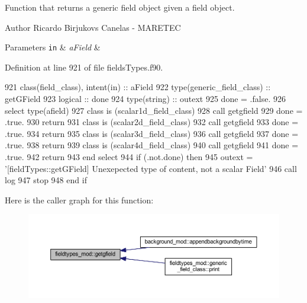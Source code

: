 Function that returns a generic field object given a field object. 

\begin{DoxyAuthor}{Author}
Ricardo Birjukovs Canelas -\/ M\+A\+R\+E\+T\+EC 
\end{DoxyAuthor}

\begin{DoxyParams}[1]{Parameters}
\mbox{\tt in}  & {\em a\+Field} & \\
\hline
\end{DoxyParams}


Definition at line 921 of file fields\+Types.\+f90.


\begin{DoxyCode}
921     \textcolor{keywordtype}{class}(field\_class), \textcolor{keywordtype}{intent(in)} :: aField
922     \textcolor{keywordtype}{type}(generic\_field\_class) :: getGField
923     \textcolor{keywordtype}{logical} :: done
924     \textcolor{keywordtype}{type}(string) :: outext
925     done = .false.
926     \textcolor{keywordflow}{select type}(afield)
927 \textcolor{keywordflow}{    class is} (scalar1d\_field\_class)
928         \textcolor{keyword}{call }getgfield%
929         done = .true.
930         \textcolor{keywordflow}{return}
931 \textcolor{keywordflow}{    class is} (scalar2d\_field\_class)
932         \textcolor{keyword}{call }getgfield%
933         done = .true.
934         \textcolor{keywordflow}{return}
935 \textcolor{keywordflow}{    class is} (scalar3d\_field\_class)
936         \textcolor{keyword}{call }getgfield%
937         done = .true.
938         \textcolor{keywordflow}{return}
939 \textcolor{keywordflow}{    class is} (scalar4d\_field\_class)
940         \textcolor{keyword}{call }getgfield%
941         done = .true.
942         \textcolor{keywordflow}{return}
943 \textcolor{keywordflow}{    end select}
944     \textcolor{keywordflow}{if} (.not.done) \textcolor{keywordflow}{then}
945         outext = \textcolor{stringliteral}{'[fieldTypes::getGField] Unexepected type of content, not a scalar Field'}
946         \textcolor{keyword}{call }log%
947         stop
948 \textcolor{keywordflow}{    end if}
\end{DoxyCode}
Here is the caller graph for this function\+:\nopagebreak
\begin{figure}[H]
\begin{center}
\leavevmode
\includegraphics[width=350pt]{namespacefieldtypes__mod_a73c64e544ca15d30975aad5a35c2d904_icgraph}
\end{center}
\end{figure}
